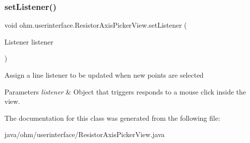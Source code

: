 \subsubsection{\texorpdfstring{set\+Listener()}{setListener()}}
{\footnotesize\ttfamily void ohm.\+userinterface.\+Resistor\+Axis\+Picker\+View.\+set\+Listener (\begin{DoxyParamCaption}\item[{Listener}]{listener }\end{DoxyParamCaption})}

Assign a line listener to be updated when new points are selected 
\begin{DoxyParams}{Parameters}
{\em listener} & Object that triggers responds to a mouse click inside the view. \\
\hline
\end{DoxyParams}


The documentation for this class was generated from the following file\+:\begin{DoxyCompactItemize}
\item 
java/ohm/userinterface/Resistor\+Axis\+Picker\+View.\+java\end{DoxyCompactItemize}
